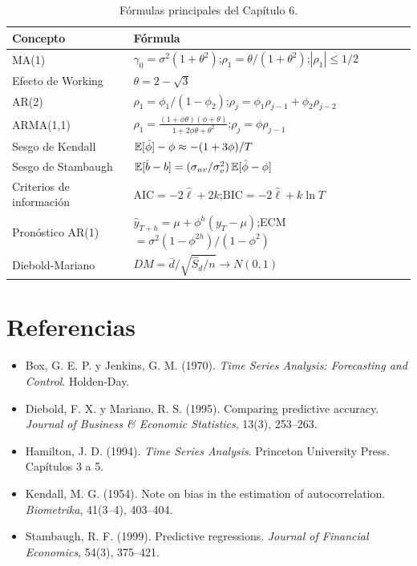 \begin{table}[H]
\centering\small
\begin{tabular}{@{}ll@{}}
\toprule
Concepto & Fórmula \\
\midrule
MA(1) & $\gamma_0=\sigma^2(1+\theta^2)$;\quad $\rho_1=\theta/(1+\theta^2)$;\quad $|\rho_1|\le1/2$ \\
Efecto de Working & $\theta=2-\sqrt3$ \\
AR(2) & $\rho_1=\phi_1/(1-\phi_2)$;\quad $\rho_j=\phi_1\rho_{j-1}+\phi_2\rho_{j-2}$ \\
ARMA(1,1) & $\rho_1=\frac{(1+\phi\theta)(\phi+\theta)}{1+2\phi\theta+\theta^2}$;\quad $\rho_j=\phi\rho_{j-1}$ \\
Sesgo de Kendall & $\mathbb{E}[\hat\phi]-\phi\approx-(1+3\phi)/T$ \\
Sesgo de Stambaugh & $\mathbb{E}[\hat b-b]=(\sigma_{uv}/\sigma_v^2)\,\mathbb{E}[\hat\phi-\phi]$ \\
Criterios de información & $\mathrm{AIC}=-2\hat\ell+2k$;\quad $\mathrm{BIC}=-2\hat\ell+k\ln T$ \\
Pronóstico AR(1) & $\hat y_{T+h}=\mu+\phi^h(y_T-\mu)$;\quad ECM $=\sigma^2(1-\phi^{2h})/(1-\phi^2)$ \\
Diebold-Mariano & $DM=\bar d/\sqrt{\hat S_d/n}\to N(0,1)$ \\
\bottomrule
\end{tabular}
\caption{Fórmulas principales del Capítulo 6.}
\end{table}

\section*{Referencias}
\begin{itemize}[leftmargin=*]
  \item Box, G. E. P. y Jenkins, G. M. (1970). \emph{Time Series Analysis: Forecasting and Control}.
        Holden-Day.
  \item Diebold, F. X. y Mariano, R. S. (1995). Comparing predictive accuracy. \emph{Journal of Business \&
        Economic Statistics}, 13(3), 253--263.
  \item Hamilton, J. D. (1994). \emph{Time Series Analysis}. Princeton University Press. Capítulos 3 a 5.
  \item Kendall, M. G. (1954). Note on bias in the estimation of autocorrelation. \emph{Biometrika},
        41(3--4), 403--404.
  \item Stambaugh, R. F. (1999). Predictive regressions. \emph{Journal of Financial Economics}, 54(3),
        375--421.
\end{itemize}
